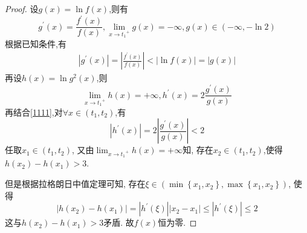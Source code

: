 \documentclass[lang=cn,newtx,10pt,scheme=chinese]{../Template/elegantbook}
\begin{document}
\begin{proof}
设$g(x)=\ln f(x)$,则有
\begin{equation}
g^{\prime}(x)=\frac{f^{\prime}(x)}{f(x)}
,\lim_{x\rightarrow {t_1}^{+}} g\left( x \right) =-\infty ,g\left( x \right) \in \left( -\infty ,-\ln 2 \right) 
\nonumber
\end{equation}
根据已知条件,有
\begin{equation}\label{1111}
\begin{split}
\left| g^{\prime}\left( x \right) \right|=\left| \frac{f^{\prime}\left( x \right)}{f\left( x \right)} \right|<\left| \ln f\left( x \right) \right|=\left| g\left( x \right) \right|
\end{split}
\end{equation}
再设$h(x)=\ln g^2(x)$,则
\begin{equation}
\lim_{x\rightarrow {t_1}^{+}} h\left( x \right) =+\infty
,h^{\prime}(x)=2\frac{g^{\prime}(x)}{g(x)}
\nonumber
\end{equation}
再结合\eqref{1111},对$\forall x\in(t_1,t_2)$,有
\begin{equation}
\left| h^{\prime}(x) \right|=2\left| \frac{g^{\prime}(x)}{g(x)} \right|<2
\nonumber
\end{equation}
任取$x_1\in(t_1,t_2)$,
又由$\lim_{x\rightarrow {t_1}^{+}} h\left( x \right) =+\infty$知,
存在$x_2\in (t_1,t_2)$,使得$h(x_2)-h(x_1)>3$.

但是根据拉格朗日中值定理可知,
存在$\xi \in \left( \min \left\{ x_1,x_2 \right\} ,\max \left\{ x_1,x_2 \right\} \right)$,
使得
\begin{equation}
\left| h\left( x_2 \right) -h\left( x_1 \right) \right|=\left| h^{\prime}\left( \xi \right) \right|\left| x_2-x_1 \right|\leqslant \left| h^{\prime}\left( \xi \right) \right|\leqslant 2
\nonumber
\end{equation}
这与$h(x_2)-h(x_1)>3$矛盾.
故$f(x)$恒为零.

\end{proof}
\end{document}
